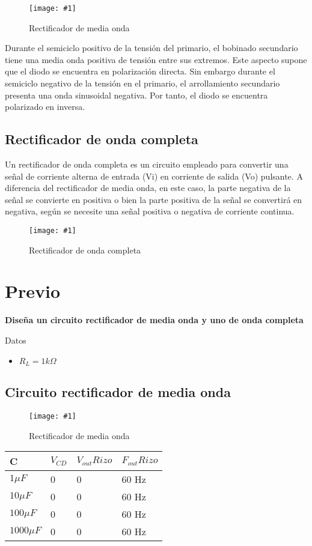 \documentclass{mylib/reporteConCalif}
\newcommand{\insertImage}[3]{
	\begin{figure}[H]
		\centering
		\texttt{[image: \#1]}
		\caption{#2}
	\end{figure}
}
\begin{document}
\insertImage{img/labdisp_pract4/hwr}{Rectificador de media onda}{8}
	
Durante el semiciclo positivo de la tensión del primario, el bobinado secundario tiene una media onda positiva de tensión entre sus extremos. Este aspecto supone que el diodo se encuentra en polarización directa. Sin embargo durante el semiciclo negativo de la tensión en el primario, el arrollamiento secundario presenta una onda sinusoidal negativa. Por tanto, el diodo se encuentra polarizado en inversa.

\subsection{Rectificador de onda completa}

Un rectificador de onda completa es un circuito empleado para convertir una señal de corriente alterna de entrada (Vi) en corriente de salida (Vo) pulsante. A diferencia del rectificador de media onda, en este caso, la parte negativa de la señal se convierte en positiva o bien la parte positiva de la señal se convertirá en negativa, según se necesite una señal positiva o negativa de corriente continua.

\insertImage{img/labdisp_pract4/fwr}{Rectificador de onda completa}{8}


\newpage
\section{Previo}

\textbf{Diseña un circuito rectificador de media onda y uno de onda completa}

Datos
\begin{itemize}
	\item $R_L = 1k\Omega$
\end{itemize}

\subsection{Circuito rectificador de media onda}

	\insertImage{img/labdisp_pract4/hwrc}{Rectificador de media onda}{12}
	\begin{center}
	\begin{tabu} to 0.8\textwidth { | X[c] | X[c] | X[c] | X[c] | }
		 \hline
		 C & $V_{CD}$ & $V_{out}Rizo$ & $F_{out}Rizo$ \\
		 \hline
		 $1 \mu F$ & 0 & 0 & 60 Hz \\
		 \hline
		 $10 \mu F$ & 0 & 0 & 60 Hz \\
		 \hline
		 $100 \mu F$ & 0 & 0 & 60 Hz \\
		 \hline
		 $1000 \mu F$ & 0 & 0 & 60 Hz \\
		 \hline
	\end{tabu}
	\end{center}
\end{document}
